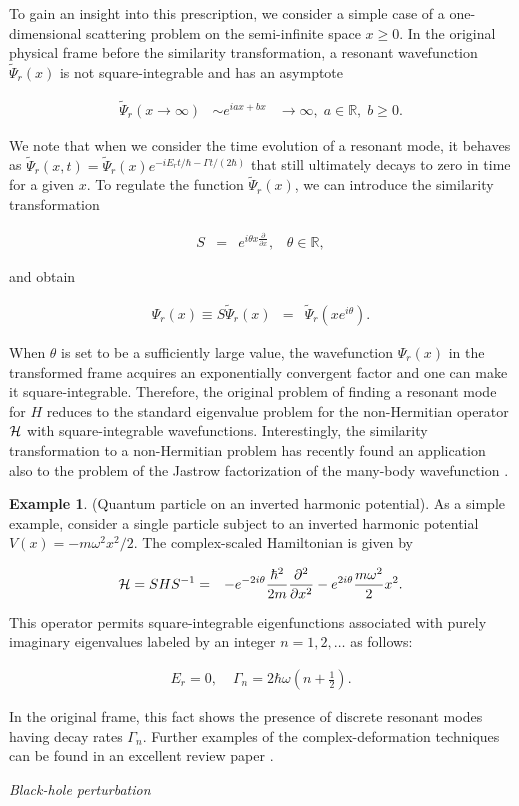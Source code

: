 \documentclass{tADP2e}
\theoremstyle{plain}
\newcommand{\eqn}[1]{
\begin{eqnarray}
	#1
\end{eqnarray}
}
\theoremstyle{plain}
\theoremstyle{definition}
\newtheorem{example}{Example}[section]
\newcommand{\exmp}[1]{
\begin{example}
	#1
\end{example}
}
\begin{document}
To gain an insight into this prescription, we consider a simple case of a one-dimensional scattering problem on the semi-infinite space $x\geq0$. In the original physical frame before the similarity transformation, a resonant wavefunction $\tilde{\Psi}_r(x)$ is not square-integrable and has an asymptote
\eqn{
\tilde{\Psi}_{r}(x\to\infty) & \sim e^{iax+bx} & \to\infty,\;a\in\mathbb{R},\;b\geq0.
}
We note that when we consider the time evolution of a resonant mode, it behaves as $\tilde{\Psi}_{r}(x,t)=\tilde{\Psi}_{r}(x)e^{-iE_{r}t/\hbar-\Gamma t/(2\hbar)}$ that still ultimately decays to zero in time for a given $x$. To regulate the function  $\tilde{\Psi}_r(x)$, we can introduce the similarity transformation
\eqn{
S & = & e^{i\theta x\frac{\partial}{\partial x}},\;\;\;\theta\in{\mathbb R},
}
and obtain
\eqn{
\Psi_{r}(x)\equiv S\tilde{\Psi}_{r}(x) & = & \tilde{\Psi}_{r}(xe^{i\theta}).
}
When $\theta$ is set to be a sufficiently large value, the wavefunction $\Psi_r(x)$ in the transformed frame acquires an exponentially convergent factor and one can make it square-integrable. Therefore, the original problem of finding a resonant mode for $H$ reduces to the standard eigenvalue problem for the non-Hermitian operator $\cal H$ with square-integrable wavefunctions. Interestingly, the similarity transformation to a non-Hermitian problem has recently found an application also to the problem of the Jastrow factorization of the many-body wavefunction \cite{CAJ19}.   
\exmp{(Quantum particle on an inverted harmonic potential). As a simple example, consider a single particle subject to an inverted harmonic potential $V(x)=-m\omega^2 x^2/2$. The complex-scaled Hamiltonian is given by
\eqn{
{\cal H}=SHS^{-1} & = & -e^{-2i\theta}\frac{\hbar^{2}}{2m}\frac{\partial^{2}}{\partial x^{2}}-e^{2i\theta}\frac{m\omega^{2}}{2}x^{2}.
}
This operator permits square-integrable eigenfunctions associated with purely imaginary eigenvalues labeled by an integer $n=1,2,\ldots$ as follows:
\eqn{
E_{r}=0, & \;\Gamma_{n}=2\hbar\omega\left(n+\frac{1}{2}\right).
}
In the original frame, this fact shows the presence of discrete resonant modes having decay rates $\Gamma_n$. Further examples of the complex-deformation techniques can be found in an excellent review paper \cite{NM98}.
}
\noindent
{\it Black-hole perturbation}
\end{document}
